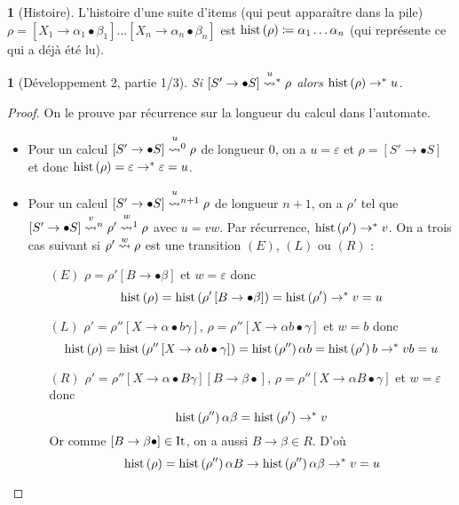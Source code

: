 \documentclass[10pt,a4paper,notitlepage]{article}
\theoremstyle{plain}
\theoremstyle{definition}
\newtheorem{defn}[thm]{\protect\definitionname}
\theoremstyle{definition}
\theoremstyle{remark}
\theoremstyle{remark}
\theoremstyle{plain}
\newtheorem{lem}[thm]{\protect\lemmaname}
\theoremstyle{plain}
\theoremstyle{plain}
\theoremstyle{remark}
\providecommand{\definitionname}{Définition}
\providecommand{\lemmaname}{Lemme}
\begin{document}
\begin{defn}[Histoire]
	
	L'histoire d'une suite d'items (qui peut apparaître dans la pile)
	$\rho=\left[X_{1}\to\alpha_{1}\bullet\beta_{1}\right]\dots\left[X_{n}\to\alpha_{n}\bullet\beta_{n}\right]$
	est $\operatorname{hist}\left(\rho\right)\coloneqq\alpha_{1}\dots\alpha_{n}$ (qui représente
	ce qui a déjà été lu).\end{defn}
\begin{lem}[Développement 2, partie 1/3]
	Si $\left[S'\to\bullet S\right]\transitionn u*\rho$ alors $\operatorname{hist}\left(\rho\right)\to^{*}u$.\label{lem:hist}\end{lem}
\begin{proof}
	On le prouve par récurrence sur la longueur du calcul dans l'automate.
	\begin{itemize}
		\item Pour un calcul $\left[S'\to\bullet S\right]\transitionn u0\rho$ de
		longueur $0$, on a $u=\varepsilon$ et $\rho=\left[S'\to\bullet S\right]$
		et donc $\operatorname{hist}\left(\rho\right)=\varepsilon\to^{*}\varepsilon=u$.
		\item Pour un calcul $\left[S'\to\bullet S\right]\transitionn u{n+1}\rho$
		de longueur $n+1$, on a $\rho'$ tel que $\left[S'\to\bullet S\right]\transitionn vn\rho'\transitionn w1\rho$
		avec $u=vw$. Par récurrence, $\operatorname{hist}\left(\rho'\right)\to^{*}v$. On a trois
		cas suivant si $\rho'\overset{w}{\leadsto}\rho$ est une transition $(E)$,
		$(L)$ ou $(R)$ :
		
		\begin{itemize}
			\item[$(E)$]  $\rho=\rho'\left[B\to\bullet\beta\right]$ et $w=\varepsilon$ donc
			\[
			\operatorname{hist}\left(\rho\right)=\operatorname{hist}\left(\rho'\left[B\to\bullet\beta\right]\right)=\operatorname{hist}\left(\rho'\right)\to^{*}v=u
			\]
			
			\item[$(L)$]  $\rho'=\rho''\left[X\to\alpha\bullet b\gamma\right]$, $\rho=\rho''\left[X\to\alpha b\bullet\gamma\right]$
			et $w=b$ donc
			\[
			\operatorname{hist}\left(\rho\right)=\operatorname{hist}\left(\rho''\left[X\to\alpha b\bullet\gamma\right]\right)=\operatorname{hist}\left(\rho''\right)\alpha b=\operatorname{hist}\left(\rho'\right)b\to^{*}vb=u
			\]
			
			\item[$(R)$]  $\rho'=\rho''\left[X\to\alpha\bullet B\gamma\right]\left[B\to\beta\bullet\right]$,
			$\rho=\rho''\left[X\to\alpha B\bullet\gamma\right]$ et $w=\varepsilon$
			donc
			\[
			\operatorname{hist}\left(\rho''\right)\alpha\beta=\operatorname{hist}\left(\rho'\right)\to^{*}v
			\]
			Or comme $\left[B\to\beta\bullet\right]\in\operatorname{It}$, on a aussi $B\to\beta\in R$.
			D'où
			\[
			\operatorname{hist}\left(\rho\right)=\operatorname{hist}\left(\rho''\right)\alpha B\to\operatorname{hist}\left(\rho''\right)\alpha\beta\to^{*}v=u
			\]
			
		\end{itemize}
	\end{itemize}
\end{proof}
\end{document}
